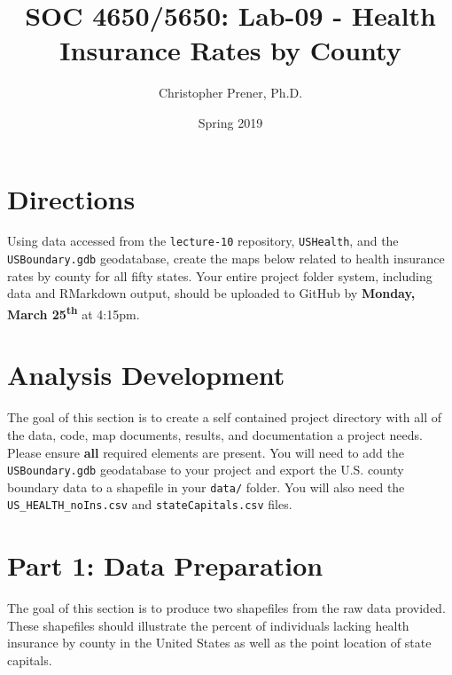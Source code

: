 \documentclass{tufte-handout}
\title{SOC 4650/5650: Lab-09 - Health Insurance Rates by County}
\author{Christopher Prener, Ph.D.}
\date{Spring 2019}
\begin{document}

\maketitle %


\vspace{5mm}
\section{Directions}
Using data accessed from the \texttt{lecture-10} repository, \texttt{USHealth}, and the \texttt{USBoundary.gdb} geodatabase, create the maps below related to health insurance rates by county for all fifty states. Your entire project folder system, including data and RMarkdown output, should be uploaded to GitHub by \textbf{Monday, March 25\textsuperscript{th}} at 4:15pm.

\vspace{5mm}
\section{Analysis Development}
The goal of this section is to create a self contained project directory with all of the data, code, map documents, results, and documentation a project needs. Please ensure \textbf{all} required elements are present. You will need to add the \texttt{USBoundary.gdb} geodatabase to your project and export the U.S. county boundary data to a shapefile in your \texttt{data/} folder. You will also need the \texttt{US\_HEALTH\_noIns.csv} and \texttt{stateCapitals.csv} files.

\vspace{5mm}
\section{Part 1: Data Preparation}
The goal of this section is to produce two shapefiles from the raw data provided. These shapefiles should illustrate the percent of individuals lacking health insurance by county in the United States as well as the point location of state capitals. 
\end{document}

